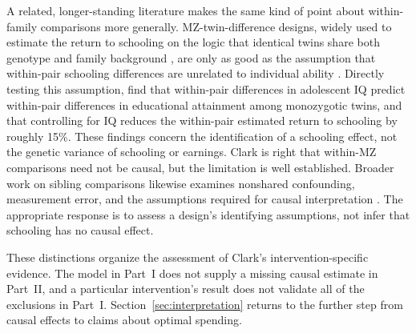 A related, longer-standing literature makes the same kind of point about
within-family comparisons more generally. MZ-twin-difference designs, widely
used to estimate the return to schooling on the logic that identical twins
share both genotype and family background \citep{Griliches1979}, are only as
good as the assumption that within-pair schooling differences are unrelated
to individual ability \citep{Griliches1977,BoundSolon1999,Neumark1999}.
Directly testing this assumption, \citet{SandewallEtAl2014} find that
within-pair differences in adolescent IQ predict within-pair differences in
educational attainment among monozygotic twins, and that controlling for IQ
reduces the within-pair estimated return to schooling by roughly 15\%. These findings concern the identification of a schooling effect,
not the genetic variance of schooling or earnings. Clark is right that
within-MZ comparisons need not be causal, but the limitation is well
established. Broader work on sibling comparisons likewise examines
nonshared confounding, measurement error, and the assumptions required
for causal interpretation \citep{SjolanderEtAl2012,SjolanderEtAl2022}.
The appropriate response is to assess a design's identifying assumptions,
not infer that schooling has no causal effect.


These distinctions organize the assessment of Clark's intervention-specific
evidence. The model in Part~I does not supply a missing causal estimate in
Part~II, and a particular intervention's result does not validate all of
the exclusions in Part~I. Section~\ref{sec:interpretation} returns to the
further step from causal effects to claims about optimal spending.
